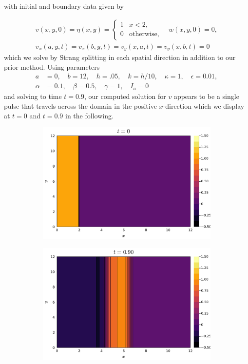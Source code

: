 \documentclass{article}
\begin{document}
with initial and boundary data given by

\begin{align*}
	v(x,y,0) = \eta(x,y) = \begin{cases} 1 & x < 2,\\
		0 & \text{otherwise}, \end{cases} \quad w(x,y,0) = 0,\\
	v_x(a,y,t) = v_x(b,y,t) = v_y(x,a,t) = v_y(x,b,t) = 0
\end{align*}
which we solve by Strang splitting in each spatial direction in addition to our prior method. Using parameters \begin{align*}
	a &= 0, \quad b = 12, \quad h = .05, \quad k = h/10, \quad \kappa = 1, \quad \epsilon = 0.01,\\
	\alpha &= 0.1, \quad \beta = 0.5, \quad \gamma = 1, \quad I_a = 0
\end{align*}
and solving to time $t=0.9$, our computed solution for $v$ appears to be a single pulse that
travels across the domain in the positive \(x\)-direction which we display at $t=0$ and $t=0.9$ in the following. 
\begin{figure}[H]
	\centering
	\begin{subfigure}{0.495\linewidth}
		\centering
		\includegraphics[width=\linewidth]{prob6_t=0.pdf}
	\end{subfigure}
	\begin{subfigure}{0.495\linewidth}
		\centering
		\includegraphics[width=\linewidth]{prob6_t=0.9.pdf}
	\end{subfigure}
\end{figure}
\end{document}
